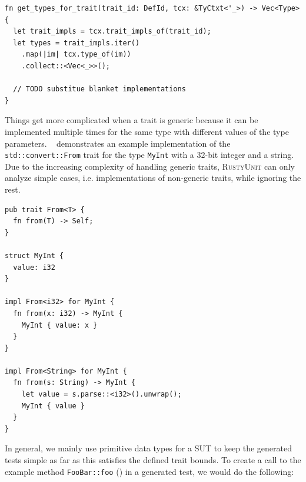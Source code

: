 \documentclass[paper=a4,%
  twoside,%
  BCOR4mm,%
  abstract=true,%
  toc=bibliography,%
  chapterprefix=true,%
  toc=bibliographynumbered,%
  open=right,%
  english,%
  pagesize=pdftex]{scrreprt}
\newcommand{\tech}{\textsc{RustyUnit}\xspace}
\begin{document}
\begin{lstlisting}[style=boxed, caption={Query types for a trait}, label=lst:query-types-that-implement-trait]
fn get_types_for_trait(trait_id: DefId, tcx: &TyCtxt<'_>) -> Vec<Type> {
  let trait_impls = tcx.trait_impls_of(trait_id);
  let types = trait_impls.iter()
    .map(|im| tcx.type_of(im))
    .collect::<Vec<_>>();

  // TODO substitue blanket implementations
}
\end{lstlisting}

Things get more complicated when a trait is generic because it can be implemented multiple times for the same type with different values of the type parameters. ~ demonstrates an example implementation of the \texttt{std::convert::From} trait for the type \texttt{MyInt} with a 32-bit integer and a string. Due to the increasing complexity of handling generic traits, \tech can only analyze simple cases, i.e. implementations of non-generic traits, while ignoring the rest.

\begin{lstlisting}[style=boxed, caption={Example implementation oft the std::convert::From trait from the Rust standard library}, label=lst:from-trait-example]
pub trait From<T> {
  fn from(T) -> Self;
}

struct MyInt {
  value: i32
}

impl From<i32> for MyInt {
  fn from(x: i32) -> MyInt {
    MyInt { value: x }
  }
}

impl From<String> for MyInt {
  fn from(s: String) -> MyInt {
    let value = s.parse::<i32>().unwrap();
    MyInt { value }
  }
}
\end{lstlisting}


In general, we mainly use primitive data types for a \ac{SUT} to keep the generated tests simple as far as this satisfies the defined trait bounds. To create a call to the example method \texttt{FooBar::foo} () in a generated test, we would do the following:
\end{document}
